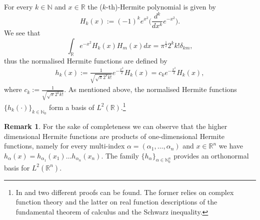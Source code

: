 \documentclass[12pt,oneside,a4paper]{book}
\numberwithin{equation}{section}     %
\theoremstyle{plain}
\theoremstyle{definition}
\newtheorem{remark}[theorem]{Remark}
\newcommand{\N}{{\mathbb N}}
\newcommand{\R}{{\mathbb R}}
\newcommand{\Rn}{{\R}^n}
\begin{document}
For every $k\in\N$ and $x\in\R$ the ($k$-th)-Hermite polynomial is given by
\[
H_k(x):=(-1)^ke^{x^2}\Big(\frac{d^k}{dx^k}e^{-x^2}\Big).
\]
We see that
\[
\int_\R{e^{-x^2}H_k(x)H_m(x)}dx=\pi^{\frac{1}{2}}2^{k}k!\delta_{km},
\]
thus the {normalised Hermite functions} are defined by
\begin{align}\label{h}
h_k(x):=\frac{1}{\sqrt{\sqrt\pi 2^kk!}}e^{-\frac{x^2}{2}}H_k(x)=c_ke^{-\frac{x^2}{2}}H_k(x),
\end{align}
where $c_k:=\frac{1}{\sqrt{\sqrt\pi 2^kk!}}$. As mentioned above, the normalised Hermite functions $\{h_k(\cdot)\}_{k\in\N_0}$ form a basis of $L^2(\R)$.\footnote{In \cite{Fol} and \cite{J2014} two different proofs can be found. The former relies on complex function theory and the latter on real function descriptions of the fundamental theorem of calculus and the Schwarz inequality.}
\begin{remark}
	For the sake of completeness we can observe that the higher dimensional Hermite functions are products of one-dimensional Hermite functions, namely for every multi-index $\alpha=(\alpha_1,\dots,\alpha_n)$ and $x\in\Rn$ we have $h_\alpha(x)=h_{\alpha_1}(x_1)\dots h_{\alpha_n}(x_n)$. The family $\{h_{\alpha}\}_{\alpha\in\N^n_0}$ provides an orthonormal basis for $L^2(\Rn)$.
\end{remark}
\end{document}
